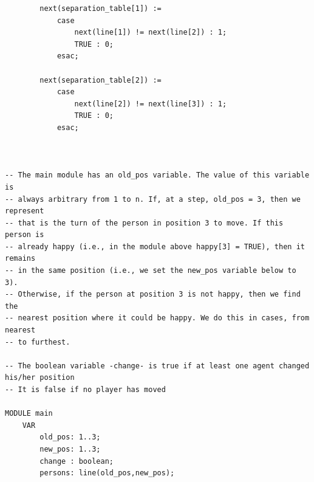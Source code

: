 \documentclass[twoside,openright]{article}
\begin{document}
\begin{appendices}
\begin{lstlisting}
		next(separation_table[1]) := 
			case 
				next(line[1]) != next(line[2]) : 1;
				TRUE : 0;
 			esac;

		next(separation_table[2]) := 
			case 
				next(line[2]) != next(line[3]) : 1;
				TRUE : 0;
 			esac;



-- The main module has an old_pos variable. The value of this variable is
-- always arbitrary from 1 to n. If, at a step, old_pos = 3, then we represent
-- that is the turn of the person in position 3 to move. If this person is
-- already happy (i.e., in the module above happy[3] = TRUE), then it remains
-- in the same position (i.e., we set the new_pos variable below to 3).
-- Otherwise, if the person at position 3 is not happy, then we find the
-- nearest position where it could be happy. We do this in cases, from nearest
-- to furthest. 

-- The boolean variable -change- is true if at least one agent changed his/her position
-- It is false if no player has moved

MODULE main
	VAR
		old_pos: 1..3;
		new_pos: 1..3;
		change : boolean; 
		persons: line(old_pos,new_pos);


\end{lstlisting}
\end{appendices}
\end{document}
